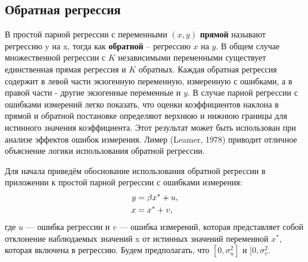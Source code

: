 \subsection*{Обратная регрессия} 

В простой парной регрессии с переменными $(x, y)$ {\bf прямой} называют регрессию y на x, тогда как {\bf обратной} – регрессию $x$ на $y$. В общем случае множественной регрессии с $K$ независимыми переменными существует единственная прямая регрессия и $K$ обратных. Каждая обратная регрессия содержит в левой части экзогенную переменную, измеренную с ошибками, а в правой части - другие экзогенные переменные и $y$. В случае парной регрессии с ошибками измерений легко показать, что оценки коэффициентов наклона в прямой и обратной постановке определяют верхнюю и нижнюю границы для истинного значения коэффициента. Этот результат может быть использован при анализе эффектов ошибок измерения. Лимер (Leamer, 1978) приводит отличное объяснение логики использования обратной регрессии.
 
Для начала приведём обоснование использования обратной регрессии в приложении к простой парной регрессии с ошибками измерения:
\begin{align}
y&=\beta x^*+u, \\
x&=x^*+v, \notag
\end{align}
где $u$ --– ошибка регрессии  и $v$ --– ошибка измерений, которая представляет собой отклонение наблюдаемых значений x от истинных значений переменной $x^*$, которая включена в регрессию. Будем предполагать, что $ [0,\sigma^2_u]$ и $ [0,\sigma^2_v$.


